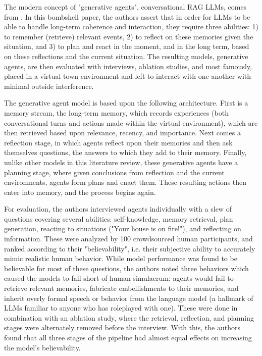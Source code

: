 The modern concept of "generative agents", conversational RAG LLMs, comes from \cite{Park2023}. In this bombshell paper, the authors assert that in order for LLMs to be able to handle long-term coherence and interaction, they require three abilities: 1) to remember (retrieve) relevant events, 2) to reflect on these memories given the situation, and 3) to plan and react in the moment, and in the long term, based on these reflections and the current situation. The resulting models, generative agents, are then evaluated with interviews, ablation studies, and most famously, placed in a virtual town environment and left to interact with one another with minimal outside interference.

The generative agent model is based upon the following architecture. First is a memory stream, the long-term memory, which records experiences (both conversational turns and actions made within the virtual environment), which are then retrieved based upon relevance, recency, and importance. Next comes a reflection stage, in which agents reflect upon their memories and then ask themselves questions, the answers to which they add to their memory. Finally, unlike other models in this literature review, these generative agents have a planning stage, where given conclusions from reflection and the current environments, agents form plans and enact them. These resulting actions then enter into memory, and the process begins again.
	
For evaluation, the authors interviewed agents individually with a slew of questions covering several abilities: self-knowledge, memory retrieval, plan generation, reacting to situations ("Your house is on fire!"), and reflecting on information. These were analyzed by 100 crowdsourced human participants, and ranked according to their "believability", i.e. their subjective ability to accurately mimic realistic human behavior. While model performance was found to be believable for most of these questions, the authors noted three behaviors which caused the models to fall short of human simulacrum: agents would fail to retrieve relevant memories, fabricate embellishments to their memories, and inherit overly formal speech or behavior from the language model (a hallmark of LLMs familiar to anyone who has roleplayed with one). These were done in combination with an ablation study, where the retrieval, reflection, and planning stages were alternately removed before the interview. With this, the authors found that all three stages of the pipeline had almost equal effects on increasing the model's believability.

